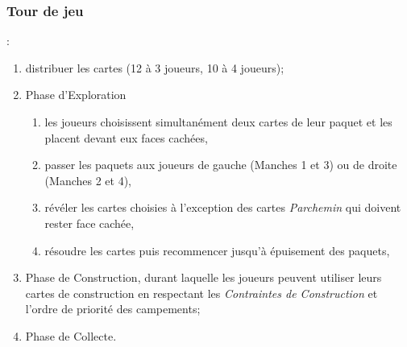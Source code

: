 \documentclass[11pt]{beamer}
\begin{document}
	\begin{frame}
		\frametitle{Tour de jeu}
		
		:
		\begin{enumerate}
			\item distribuer les cartes (12 à 3 joueurs, 10 à 4 joueurs);
			\item Phase d'Exploration
				\begin{enumerate}
					\item les joueurs choisissent simultanément deux cartes de leur paquet et les placent devant eux faces cachées,
					\item passer les paquets aux joueurs de gauche (Manches 1 et 3) ou de droite (Manches 2 et 4),
					\item révéler les cartes choisies à l'exception des cartes \emph{Parchemin} qui doivent rester face cachée,
					\item résoudre les cartes puis recommencer jusqu'à épuisement des paquets,
				\end{enumerate}
			\item Phase de Construction, durant laquelle les joueurs peuvent utiliser leurs cartes de construction en respectant les \emph{Contraintes de Construction} et l'ordre de priorité des campements;
			\item Phase de Collecte.
		\end{enumerate}
	\end{frame}

%		
%	
\end{document}
